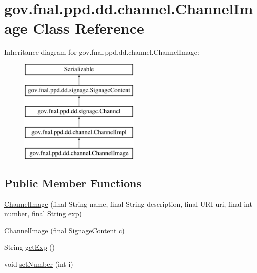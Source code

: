 \hypertarget{classgov_1_1fnal_1_1ppd_1_1dd_1_1channel_1_1ChannelImage}{\section{gov.\-fnal.\-ppd.\-dd.\-channel.\-Channel\-Image Class Reference}
\label{classgov_1_1fnal_1_1ppd_1_1dd_1_1channel_1_1ChannelImage}
}
Inheritance diagram for gov.\-fnal.\-ppd.\-dd.\-channel.\-Channel\-Image\-:\begin{figure}[H]
\begin{center}
\leavevmode
\includegraphics[height=5.000000cm]{classgov_1_1fnal_1_1ppd_1_1dd_1_1channel_1_1ChannelImage}
\end{center}
\end{figure}
\subsection*{Public Member Functions}
\begin{DoxyCompactItemize}
\item 
\hyperlink{classgov_1_1fnal_1_1ppd_1_1dd_1_1channel_1_1ChannelImage_ab18718b659f333b1858606312779339c}{Channel\-Image} (final String name, final String description, final U\-R\-I uri, final int \hyperlink{classgov_1_1fnal_1_1ppd_1_1dd_1_1channel_1_1ChannelImpl_ae4de39eb5e2f7c434f3b71f054ae9735}{number}, final String exp)
\item 
\hyperlink{classgov_1_1fnal_1_1ppd_1_1dd_1_1channel_1_1ChannelImage_a5e00f8dc7d13b8d9186dbbea54f5205a}{Channel\-Image} (final \hyperlink{interfacegov_1_1fnal_1_1ppd_1_1dd_1_1signage_1_1SignageContent}{Signage\-Content} c)
\item 
String \hyperlink{classgov_1_1fnal_1_1ppd_1_1dd_1_1channel_1_1ChannelImage_a3b35ca4da6e88f0f2f2e18fd2c4be85e}{get\-Exp} ()
\item 
void \hyperlink{classgov_1_1fnal_1_1ppd_1_1dd_1_1channel_1_1ChannelImage_ae2edd21f7326063ec9aa3f0828c4398b}{set\-Number} (int i)
\end{DoxyCompactItemize}
